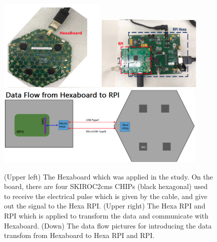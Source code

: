 \begin{figure}[!htb]
\centering
     \includegraphics[width=0.45\textwidth]{PCB_study/Hexaboard.png}
     \includegraphics[width=0.45\textwidth]{PCB_study/RPI.png}\\
     \includegraphics[width=0.9\textwidth]{PCB_study/Data_flow.png}
\caption{(Upper left) The Hexaboard which was applied in the study. On the board, there are four SKIROC2cms CHIPs (black hexagonal) used to receive the electrical pulse which is given by the cable, and give out the signal to the Hexa RPI. (Upper right) The Hexa RPI and RPI which is applied to transform the data and communicate with Hexaboard. (Down) The data flow pictures for introducing the data transfom from Hexaboard to Hexa RPI and RPI.
}
\label{fig:PCB_study_apparatus}
\end{figure}

